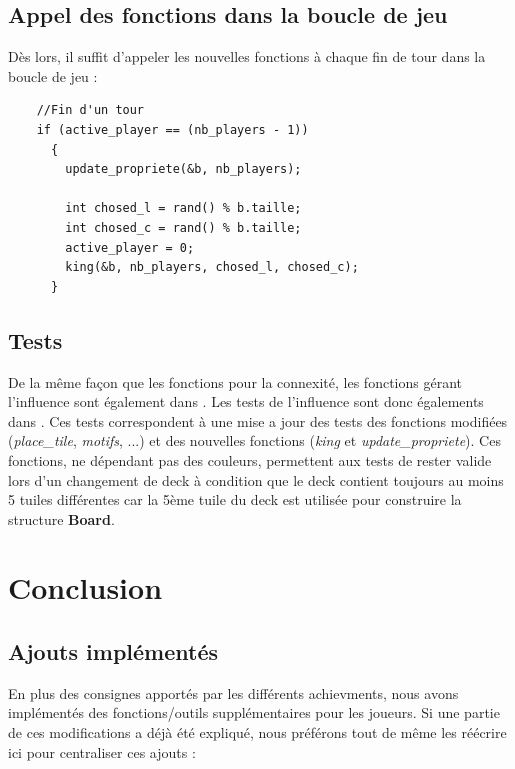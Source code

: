 \documentclass[a4paper]{article}
\begin{document}
\subsection{Appel des fonctions dans la boucle de jeu}
Dès lors, il suffit d'appeler les nouvelles fonctions à chaque fin de tour dans la boucle de jeu :

\begin{lstlisting}
    //Fin d'un tour
    if (active_player == (nb_players - 1))
      {
    	update_propriete(&b, nb_players);
    	
    	int chosed_l = rand() % b.taille;
    	int chosed_c = rand() % b.taille;
    	active_player = 0;
    	king(&b, nb_players, chosed_l, chosed_c);
      }
\end{lstlisting}

\subsection{Tests}

De la même façon que les fonctions pour la connexité, les fonctions gérant l'influence sont également dans . Les tests de l'influence sont donc égalements dans . Ces tests correspondent à une mise a jour des tests des fonctions modifiées (\emph{place\_tile}, \emph{motifs}, ...) et des nouvelles fonctions (\emph{king} et \emph{update\_propriete}). Ces fonctions, ne dépendant pas des couleurs, permettent aux tests de rester valide lors d'un changement de deck à condition que le deck contient toujours au moins 5 tuiles différentes car la 5ème tuile du deck est utilisée pour construire la structure \textbf{Board}.


\section{Conclusion}

\subsection{Ajouts implémentés}
En plus des consignes apportés par les différents achievments, nous avons implémentés des fonctions/outils supplémentaires pour les joueurs. Si une partie de ces modifications a déjà été expliqué, nous préférons tout de même les réécrire ici pour centraliser ces ajouts : \\
\end{document}
